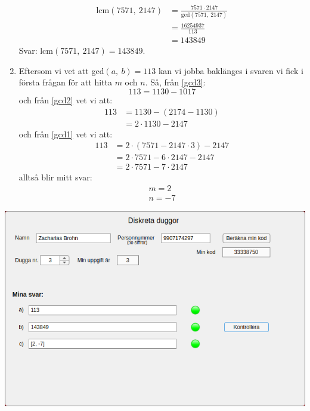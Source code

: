 \documentclass[a4paper,12pt]{article}
\begin{document}
\begin{enumerate}[label=\alph*)]
    \begin{align*}
        \text{lcm}(7571,~2147)  &= \frac{7571 \cdot 2147}{\text{gcd}(7571,~2147)} \\
                                &= \frac{16254937}{113} \\
                                &= 143849
    \end{align*}
    Svar: lcm$(7571,~2147) = 143849$.
    \newpage
    \item Eftersom vi vet att gcd$(a,~b) = 113$ kan vi jobba baklänges i svaren
    vi fick i första frågan för att
    hitta $m$ och $n$. Så, från \ref*{gcd3}:
    \begin{displaymath}
        113 = 1130 - 1017
    \end{displaymath}
    och från \ref*{gcd2} vet vi att:
    \begin{align*}
        113 &= 1130 - (2174 - 1130) \\
            &= 2 \cdot 1130 - 2147
    \end{align*}
    och från \ref*{gcd1} vet vi att:
    \begin{align*}
        113 &= 2 \cdot (7571 - 2147 \cdot 3) - 2147 \\
            &= 2 \cdot 7571 - 6 \cdot 2147 - 2147 \\
            &= 2 \cdot 7571 - 7 \cdot 2147
    \end{align*}
    alltså blir mitt svar:
    \begin{gather*}
        m = 2 \\
        n = -7
    \end{gather*}
\end{enumerate}
\includegraphics[width=\textwidth]{d1WK55L.png}
\end{document}
